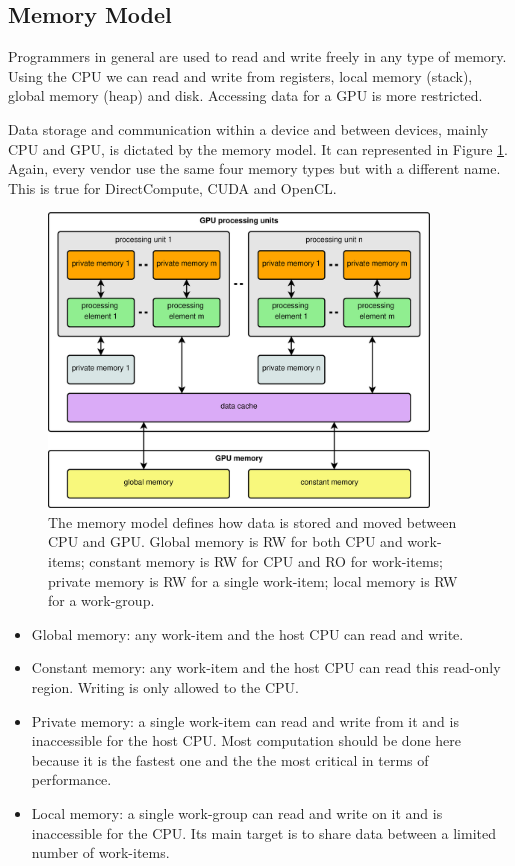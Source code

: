 \documentclass{article}
\begin{document}
\subsection{Memory Model}

Programmers in general are used to read and write freely in any type of memory. Using the CPU we can read and write from registers, local memory (stack), global memory (heap) and disk. Accessing data for a GPU is more restricted.

Data storage and communication within a device and between devices, mainly CPU and GPU, is dictated by the memory model. It can represented in Figure \ref{figure:memory}. Again, every vendor use the same four memory types but with a different name. This is true for DirectCompute, CUDA and OpenCL.

\begin{figure}[!ht]
\centering
\includegraphics[width=0.9\textwidth]{memory.eps}
\caption{The memory model defines how data is stored and moved between CPU and GPU. Global memory is RW for both CPU and work-items; constant memory is RW for CPU and RO for work-items; private memory is RW for a single work-item; local memory is RW for a work-group.}
\label{figure:memory}
\end{figure}

\begin{itemize}
\item Global memory: any work-item and the host CPU can read and write.
\item Constant memory: any work-item and the host CPU can read this read-only region. Writing is only allowed to the CPU.
\item Private memory: a single work-item can read and write from it and is inaccessible for the host CPU. Most computation should be done here because it is the fastest one and the the most critical in terms of performance.
\item Local memory: a single work-group can read and write on it and is inaccessible for the CPU. Its main target is to share data between a limited number of work-items.
\end{itemize} 
\end{document}
